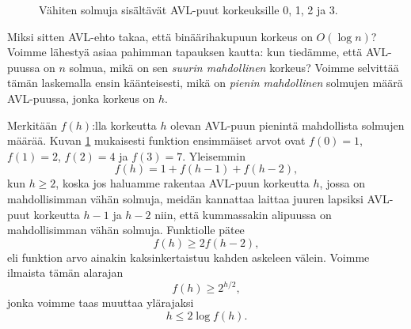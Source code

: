 \begin{figure}
\center
\scriptsize
{}
\caption{Vähiten solmuja sisältävät AVL-puut korkeuksille 0, 1, 2 ja 3.}
\label{fig:avlvah}
\end{figure}

Miksi sitten AVL-ehto takaa, että binäärihakupuun korkeus
on $O(\log n)$?
Voimme lähestyä asiaa pahimman tapauksen kautta:
kun tiedämme, että AVL-puussa on $n$ solmua,
mikä on sen \emph{suurin mahdollinen} korkeus?
Voimme selvittää tämän laskemalla ensin käänteisesti,
mikä on \emph{pienin mahdollinen} solmujen määrä
AVL-puussa, jonka korkeus on $h$.

Merkitään $f(h)$:lla korkeutta $h$ olevan AVL-puun
pienintä mahdollista solmujen määrää.
Kuvan \ref{fig:avlvah} mukaisesti funktion ensimmäiset arvot
ovat $f(0)=1$, $f(1)=2$, $f(2)=4$ ja $f(3)=7$.
Yleisemmin
\[f(h)=1+f(h-1)+f(h-2),\]
kun $h \ge 2$, koska jos haluamme rakentaa AVL-puun korkeutta $h$,
jossa on mahdollisimman vähän solmuja,
meidän kannattaa laittaa juuren lapsiksi AVL-puut
korkeutta $h-1$ ja $h-2$ niin,
että kummassakin alipuussa on mahdollisimman vähän solmuja.
Funktiolle pätee
\[f(h) \ge 2 f(h-2),\]
eli funktion arvo ainakin kaksinkertaistuu kahden askeleen välein.
Voimme ilmaista tämän alarajan
\[f(h) \ge 2^{h/2},\]
jonka voimme taas muuttaa ylärajaksi
\[ h \le 2 \log f(h).\]

